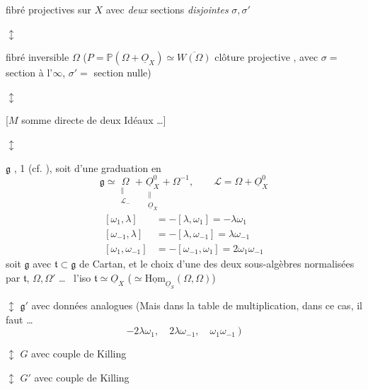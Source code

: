 \documentclass[11pt,a4paper]{article}
\begin{document}
fibré  projectives sur $X$ avec \emph{deux} sections \emph{disjointes} $\sigma, \sigma'$

$\updownarrow$

fibré inversible $\Omega$ \quad ($P = \mathbb{P}(\Omega + \underline{O}_X) \simeq \overline{W(\Omega)}$ clôture projective , avec $\sigma =$ section à l'$\infty$, $\sigma' =$ section nulle)

$\updownarrow$

[$M$ somme directe de deux Idéaux  \ldots]

$\updownarrow$

$\mathfrak{g}$  \struck{\ill{}}  ,  1 (cf. ), soit d'une graduation en \ill{}
\[
\mathfrak{g} \simeq \underset{\substack{\|\\ \mathcal{L}_{-}}}{\Omega} + \underset{\substack{\|\\ \underline{O}_X}}{\underline{O}^0_X} + \Omega^{-1},
\qquad \mathcal{L} = \Omega + \underline{O}^0_X
\]
\[
\begin{aligned}
[\omega_1, \lambda] &= -[\lambda, \omega_1] = -\lambda\omega_1\\
[\omega_{-1}, \lambda] &= -[\lambda, \omega_{-1}] = \lambda\omega_{-1}\\
[\omega_1, \omega_{-1}] &= -[\omega_{-1}, \omega_1] = 2\omega_1\omega_{-1}
\end{aligned}
\]
soit $\mathfrak{g}$ avec $\mathfrak{t}\subset\mathfrak{g}$  de Cartan, et le choix d'une des deux sous-algèbres   normalisées par $\mathfrak{t}$, $\Omega, \Omega'$ \ldots\  l'iso $\mathfrak{t} \simeq \underline{O}_X$ ($\simeq \underline{\mathrm{Hom}}_{\underline{O}_S}(\Omega,\Omega)$)

$\updownarrow$ \quad $\mathfrak{g}'$ avec données analogues (Mais dans la table de multiplication, dans ce cas, il faut \ldots
\[
-2\lambda\omega_1,\quad 2\lambda\omega_{-1},\quad \omega_1\omega_{-1}\ )
\]

$\updownarrow$ \quad $G$ avec couple de Killing

$\updownarrow$ \quad $G'$ avec couple de Killing
\end{document}
